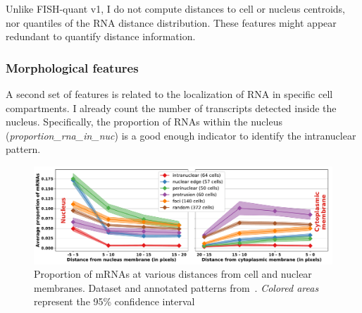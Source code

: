 Unlike FISH-quant v1, I do not compute distances to cell or nucleus centroids, nor quantiles of the \ac{RNA} distance distribution.
These features might appear redundant to quantify distance information.

\subsubsection{Morphological features}

A second set of features is related to the localization of \ac{RNA} in specific cell compartments.
I already count the number of transcripts detected inside the nucleus.
Specifically, the proportion of \ac{RNA}s within the nucleus (\emph{proportion\_rna\_in\_nuc}) is a good enough indicator to identify the intranuclear pattern.

\begin{figure}[]
    \centering
    \includegraphics[width=\textwidth]{figures/chapter4/plot_topography}
    \caption[Proportion of mRNAs in several subcellular regions]{Proportion of mRNAs at various distances from cell and nuclear membranes.
	Dataset and annotated patterns from~\cite{CHOUAIB_2020}.
	\textit{Colored areas} represent the 95\% confidence interval}
    \label{fig:features_topography}
\end{figure}

